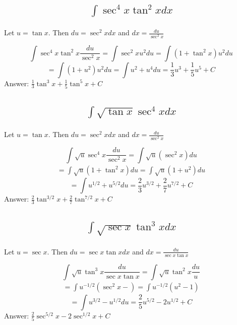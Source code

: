 \documentclass{article}
\begin{document}
\subsection{
	\begin{align*}
		\int{\sec^4{x} \tan^2{x} dx}
	\end{align*}
}

Let $u = \tan{x}$. Then $du = \sec^2{x} dx $ and $dx = \frac{du}{\sec^2{x}}$

\[ \int{ \sec^4{x}\tan^2{x}\frac{du}{\sec^2{x}}} = \int{ \sec^2{x} u^2 du } = \int{(1+ \tan^2{x})u^2 du} \]
\[= \int{(1+ u ^2)u^2 du} = \int{ u^2+ u^4 du} = \frac{1}{3} u^3 +\frac{1}{5} u^5 +C\]
Answer: $ \frac{1}{3} \tan^3{x} +\frac{1}{5} \tan^5{x} +C$

\subsection{
	\begin{align*}
		\int{\sqrt{\tan{x}} \sec^4{x} dx}
	\end{align*}
}

Let $u = \tan{x}$. Then $du = \sec^2{x} dx$ and $dx = \frac{du}{\sec^2{x}}$

\[\int{\sqrt{u} \sec^4{x} \frac{du}{\sec^2{x}}} = \int{ \sqrt{u} (\sec^2{x}) du}  \]
\begin{align*}
	=  \int{ \sqrt{u} (1+\tan^2{x}) du} = \int{ \sqrt{u} (1+ u ^2) du}
\end{align*}
\[ = \int{ u^{1/2} +u^{5/2} du} = \frac{2}{3} u^{3/2} +\frac{2}{7} u^{7/2} +C\]
Answer: $\frac{2}{3} \tan^{3/2}{x} +\frac{2}{7} \tan^{7/2}{x} +C$

\subsection{
	\begin{align*}
		\int{\sqrt{\sec{x}} \tan^3{x} dx}
	\end{align*}
}
Let $u = \sec{x}$. Then $du = \sec{x}\tan{x}dx$ and $dx = \frac{du}{\sec{x}\tan{x}}$

\[ \int{ \sqrt{u}\tan^3{x} \frac{du}{\sec{x}\tan{x}}} = \int{ \sqrt{u}\tan^2{x} \frac{du}{u}}  \]
\begin{align*}
	= \int {u^{-1/2}(\sec^2{x} - )} = \int {u^{-1/2}(u^2 - 1)}
\end{align*}
\[ = \int {u^{3/2} - u^{1/2} du} = \frac{2}{5} u ^{5/2} - 2 u^{1/2} +C\]
Answer: $ \frac{2}{5} \sec ^{5/2}{x} - 2 \sec^{1/2}{x} +C$
\end{document}
